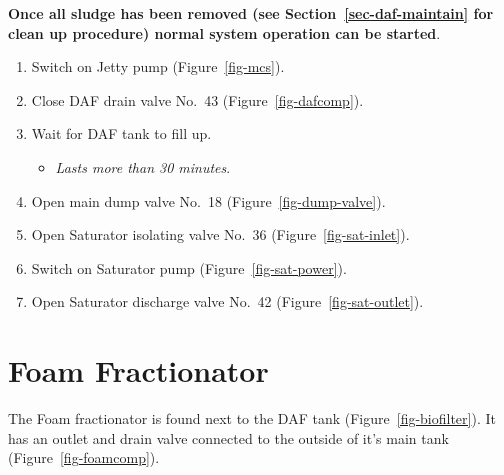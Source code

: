 \documentclass[
  12pt,
]{report}
\providecommand{\tightlist}{%
  \setlength{\itemsep}{0pt}\setlength{\parskip}{0pt}}\usepackage{longtable,booktabs,array}
\begin{document}
\textbf{Once all sludge has been removed (see
Section~\ref{sec-daf-maintain} for clean up procedure) normal system
operation can be started}.

\begin{enumerate}
\def\labelenumi{\arabic{enumi}.}
\setcounter{enumi}{20}
\tightlist
\item
  Switch on Jetty pump (Figure~\ref{fig-mcs}).
\item
  Close DAF drain valve No.~43 (Figure~\ref{fig-dafcomp}).
\item
  Wait for DAF tank to fill up.

  \begin{itemize}
  \tightlist
  \item
    \emph{Lasts more than 30 minutes}.
  \end{itemize}
\item
  Open main dump valve No.~18 (Figure~\ref{fig-dump-valve}).
\item
  Open Saturator isolating valve No.~36 (Figure~\ref{fig-sat-inlet}).
\item
  Switch on Saturator pump (Figure~\ref{fig-sat-power}).
\item
  Open Saturator discharge valve No.~42 (Figure~\ref{fig-sat-outlet}).
\end{enumerate}

\newpage

\hypertarget{sec-fractionator}{%
\chapter{Foam Fractionator}\label{sec-fractionator}}

The Foam fractionator is found next to the DAF tank
(Figure~\ref{fig-biofilter}). It has an outlet and drain valve connected
to the outside of it's main tank (Figure~\ref{fig-foamcomp}).
\end{document}
